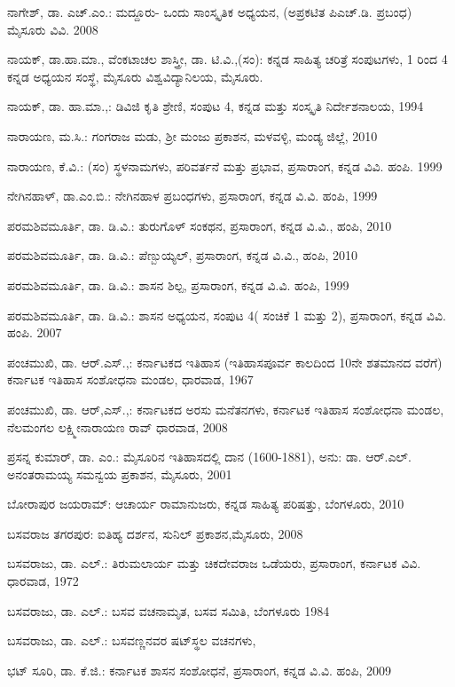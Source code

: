 \noindent
ನಾಗೇಶ್​, ಡಾ. ಎಚ್​.ಎಂ.: ಮದ್ದೂರು- ಒಂದು ಸಾಂಸ್ಕೃತಿಕ ಅಧ್ಯಯನ, (ಅಪ್ರಕಟಿತ ಪಿಎಚ್​.ಡಿ. ಪ್ರಬಂಧ) ಮೈಸೂರು ವಿವಿ. 2008

\noindent
ನಾಯಕ್​, ಡಾ.ಹಾ.ಮಾ., ವೆಂಕಟಾಚಲ ಶಾಸ್ತ್ರೀ, ಡಾ. ಟಿ.ವಿ.,(ಸಂ): ಕನ್ನಡ ಸಾಹಿತ್ಯ ಚರಿತ್ರೆ ಸಂಪುಟಗಳು, 1 ರಿಂದ 4 ಕನ್ನಡ ಅಧ್ಯಯನ ಸಂಸ್ಥೆ, ಮೈಸೂರು ವಿಶ್ವವಿದ್ಯಾನಿಲಯ, ಮೈಸೂರು.

\noindent
ನಾಯಕ್​, ಡಾ. ಹಾ.ಮಾ.,: ಡಿವಿಜಿ ಕೃತಿ ಶ್ರೇಣಿ, ಸಂಪುಟ 4, ಕನ್ನಡ ಮತ್ತು ಸಂಸ್ಕೃತಿ ನಿರ್ದೇಶನಾಲಯ, 1994

\noindent
ನಾರಾಯಣ, ಮ.ಸಿ.: ಗಂಗರಾಜ ಮಡು, ಶ‍್ರೀ ಮಂಜು ಪ್ರಕಾಶನ, ಮಳವಳ್ಳಿ, ಮಂಡ್ಯ ಜಿಲ್ಲೆ, 2010

\noindent
ನಾರಾಯಣ, ಕೆ.ವಿ.: (ಸಂ) ಸ್ಥಳನಾಮಗಳು, ಪರಿವರ್ತನೆ ಮತ್ತು ಪ್ರಭಾವ, ಪ್ರಸಾರಾಂಗ, ಕನ್ನಡ ವಿವಿ. ಹಂಪಿ. 1999

\noindent
ನೇಗಿನಹಾಳ್​, ಡಾ.ಎಂ.ಬಿ.: ನೇಗಿನಹಾಳ ಪ್ರಬಂಧಗಳು, ಪ್ರಸಾರಾಂಗ, ಕನ್ನಡ ವಿ.ವಿ. ಹಂಪಿ, 1999

\noindent
ಪರಮಶಿವಮೂರ್ತಿ, ಡಾ. ಡಿ.ವಿ.: ತುರುಗೊಳ್​ ಸಂಕಥನ, ಪ್ರಸಾರಾಂಗ, ಕನ್ನಡ ವಿ.ವಿ., ಹಂಪಿ, 2010

\noindent
ಪರಮಶಿವಮೂರ್ತಿ, ಡಾ. ಡಿ.ವಿ.: ಪೆಣ್ಬುಯ್ಯಲ್​, ಪ್ರಸಾರಾಂಗ, ಕನ್ನಡ ವಿ.ವಿ., ಹಂಪಿ, 2010

\noindent
ಪರಮಶಿವಮೂರ್ತಿ, ಡಾ. ಡಿ.ವಿ.: ಶಾಸನ ಶಿಲ್ಪ, ಪ್ರಸಾರಾಂಗ, ಕನ್ನಡ ವಿ.ವಿ. ಹಂಪಿ, 1999

\noindent
ಪರಮಶಿವಮೂರ್ತಿ, ಡಾ. ಡಿ.ವಿ.: ಶಾಸನ ಅಧ್ಯಯನ, ಸಂಪುಟ 4( ಸಂಚಿಕೆ 1 ಮತ್ತು 2), ಪ್ರಸಾರಾಂಗ, ಕನ್ನಡ ವಿವಿ. ಹಂಪಿ. 2007

\noindent
ಪಂಚಮುಖಿ, ಡಾ. ಆರ್​.ಎಸ್​.,: ಕರ್ನಾಟಕದ ಇತಿಹಾಸ (ಇತಿಹಾಸಪೂರ್ವ ಕಾಲದಿಂದ 10ನೇ ಶತಮಾನದ ವರೆಗೆ) ಕರ್ನಾಟಕ ಇತಿಹಾಸ ಸಂಶೋಧನಾ ಮಂಡಲ, ಧಾರವಾಡ, 1967

\noindent
ಪಂಚಮುಖಿ, ಡಾ. ಆರ್​,ಎಸ್​.,: ಕರ್ನಾಟಕದ ಅರಸು ಮನೆತನಗಳು, ಕರ್ನಾಟಕ ಇತಿಹಾಸ ಸಂಶೋಧನಾ ಮಂಡಲ, ನೆಲಮಂಗಲ ಲಕ್ಷ್ಮೀನಾರಾಯಣ ರಾವ್​ ಧಾರವಾಡ, 2008

\noindent
ಪ್ರಸನ್ನ ಕುಮಾರ್​, ಡಾ. ಎಂ.: ಮೈಸೂರಿನ ಇತಿಹಾಸದಲ್ಲಿ ದಾನ (1600-1881), ಅನು: ಡಾ. ಆರ್​.ಎಲ್​. ಅನಂತರಾಮಯ್ಯ ಸಮನ್ವಯ ಪ್ರಕಾಶನ, ಮೈಸೂರು, 2001

\noindent
ಬೋರಾಪುರ ಜಯರಾಮ್: ಆಚಾರ್ಯ ರಾಮಾನುಜರು, ಕನ್ನಡ ಸಾಹಿತ್ಯ ಪರಿಷತ್ತು, ಬೆಂಗಳೂರು, 2010

\noindent
ಬಸವರಾಜ ತಗರಪುರ: ಐತಿಹ್ಯ ದರ್ಶನ, ಸುನಿಲ್​ ಪ್ರಕಾಶನ,ಮೈಸೂರು, 2008

\noindent
ಬಸವರಾಜು, ಡಾ. ಎಲ್​.: ತಿರುಮಲಾರ್ಯ ಮತ್ತು ಚಿಕದೇವರಾಜ ಒಡೆಯರು, ಪ್ರಸಾರಾಂಗ, ಕರ್ನಾಟಕ ವಿವಿ. ಧಾರವಾಡ, 1972

\noindent
ಬಸವರಾಜು, ಡಾ. ಎಲ್​.: ಬಸವ ವಚನಾಮೃತ, ಬಸವ ಸಮಿತಿ, ಬೆಂಗಳೂರು 1984

\noindent
ಬಸವರಾಜು, ಡಾ. ಎಲ್​.: ಬಸವಣ್ಣನವರ ಷಟ್​ಸ್ಥಲ ವಚನಗಳು,

\noindent
ಭಟ್​ ಸೂರಿ, ಡಾ. ಕೆ.ಜಿ.: ಕರ್ನಾಟಕ ಶಾಸನ ಸಂಶೋಧನೆ, ಪ್ರಸಾರಾಂಗ, ಕನ್ನಡ ವಿ.ವಿ. ಹಂಪಿ, 2009

